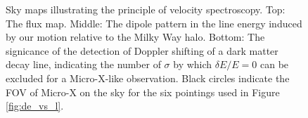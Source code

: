 \documentclass[aps,prl,10pt,twocolumn,superscriptaddress,showpacs]{revtex4-1}
\begin{document}
\begin{figure}[h!]
\begin{subfigure}[b]{1.0\columnwidth}
\end{subfigure}
\caption{Sky maps illustrating the principle of velocity spectroscopy. Top: The flux map. Middle:
	The dipole pattern in the line energy induced by our motion relative to the Milky Way halo.
	Bottom: The signicance of the detection of Doppler shifting of a dark matter decay line,
indicating the number of $\sigma$ by which $\delta E/E=0$ can be excluded for a Micro-X-like
observation. Black circles indicate the
FOV of Micro-X on the sky for the six pointings used in Figure \ref{fig:de_vs_l}. }
\label{fig:skymaps}
\end{figure}



\end{document}
